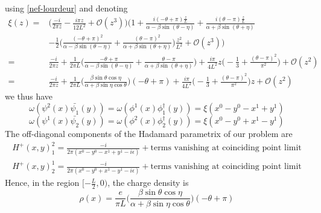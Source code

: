 using \cref{nef-lourdeur} and denoting
\begin{equation}\label{nef-xi}
\begin{split}
\xi(z) = & \Big( \frac{-i}{2 \pi z} - \frac{i \pi z}{12L^2} + \mathcal{O}(z^3) \Big)
\Big( 1 + \frac{i(-\theta + \pi)\frac{z}{L}}{\alpha - \beta\sin(\theta - \eta)} + \frac{i(\theta - \pi)\frac{z}{L}}{\alpha + \beta\sin(\theta + \eta)}  \\
& - \frac{1}{2}\Big(\frac{(-\theta + \pi)^2}{\alpha - \beta \sin (\theta - \eta)}  
+ \frac{(\theta - \pi)^2}{\alpha + \beta \sin (\theta + \eta)} \Big)\frac{z^2}{L^2}
+  \mathcal{O}(z^3) \Big)  \\
= & \frac{-i}{2 \pi z} + \frac{1}{2\pi L}\Big( \frac{-\theta + \pi}{\alpha - \beta\sin(\theta - \eta)} + \frac{\theta - \pi}{\alpha + \beta\sin(\theta + \eta)} \Big)  
 + \frac{i\pi}{4 L^2}z \big( -\frac{1}{3} + \frac{(\theta - \pi)^2}{\pi^2}\big) + \mathcal{O}(z^2) \\
= &  \frac{-i}{2 \pi z} 
+ \frac{1}{2\pi L}\Big( \frac{\beta \sin \theta \cos \eta}{\alpha + \beta \sin \eta \cos \theta}\Big) (-\theta + \pi) 
+ \frac{i\pi}{4 L^2}\big( -\frac{1}{3} + \frac{(\theta - \pi)^2}{\pi^2}\big)z+ \mathcal{O}(z^2)
\end{split}
\end{equation}
we thus have
\begin{equation*}
\omega(\psi^2(x) \bar{\psi_1}(y)) = \omega(\phi^1(x) \phi^\dagger_1(y)) 
= \xi( x^0 - y^0 - x^1 +y^1)
\end{equation*}
\begin{equation*}
\omega(\psi^1(x) \bar{\psi_2}(y)) =  \omega(\phi^2(x) \phi^\dagger_2(y)) 
= \xi(x^0 - y^0 + x^1 -y^1)
\end{equation*}
The off-diagonal components of the Hadamard parametrix of our problem are~\cite{Zahn2015}
\begin{equation}\label{vacuum-nefhadamard}
\begin{split}
H^{+} (x,y)^2_1 = \frac{-i}{2\pi (x^0 - y^0 - x^1 + y^1 -i\epsilon)} + \textrm{terms vanishing at coinciding point limit}  \\
H^{+} (x,y)^1_2 = \frac{-i}{2\pi (x^0 - y^0 + x^1 - y^1 -i\epsilon)} + \textrm{terms vanishing at coinciding point limit} 
\end{split}
\end{equation}
Hence, in the region $[-\frac{L}{2}, 0)$, the charge density is
\begin{equation}
\rho(x) = \frac{e}{\pi L}\Big( \frac{\beta \sin \theta \cos \eta}{\alpha + \beta \sin \eta \cos \theta}\Big) (-\theta + \pi)
\end{equation}
